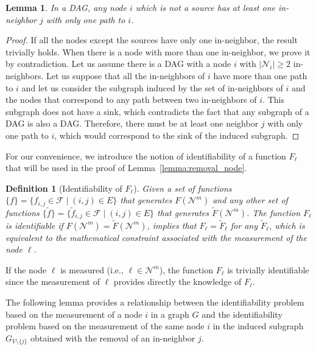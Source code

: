 \documentclass[letterpaper,10pt,journal]{IEEEtran}
\newcommand{\F}{\mathcal{F}}
\newtheorem{definition}{Definition}
\newtheorem{lemma}{Lemma}
\newcommand{\abs}[1]{\left|#1\right|}
\newcommand{\NN}{\mathcal{N}}
\newcommand{\aNN}{\abs{\mathcal{N}_i}}
\begin{document}
\begin{lemma}\label{lemma:unique_path}
    In a DAG, any node $i$ which is not a source has at least one in-neighbor $j$ with only one path to $i$.   
\end{lemma}
\begin{proof}
If all the nodes except the sources have only one in-neighbor, the result trivially holds. When there is a node with more than one in-neighbor, we prove it by contradiction. Let us assume there is a DAG with a node $i$ with $\aNN\ge 2$ in-neighbors.  Let us suppose that all the in-neighbors of $i$ have more than one path to $i$ and let us consider the subgraph induced by the set of in-neighbors of $i$ and the nodes that correspond to any path between two in-neighbors of $i$. This subgraph does not have a sink, which contradicts the fact that any subgraph of a DAG is also a DAG. Therefore, there must be at least one neighbor $j$ with only one path to $i$, which would correspond to the sink of the induced subgraph. 
\end{proof}




 

For our convenience, we introduce the notion of  identifiability of a function $F_\ell$ that will be used in the proof of Lemma~\ref{lemma:removal_node}.


\begin{definition}[Identifiability of $F_\ell$]\label{def:math_identifiability_Fi}
    Given a set of functions $\{ f \}=\{f_{i,j}\in \F\;|\;(i,j)\in E\}$ that generates $F(\NN^m)$ and any other set of functions $\{ \tilde f \}=\{\tilde f_{i,j}\in\F\;|\;(i,j)\in E\}$ that generates $\tilde F(\NN^m)$. The function $F_\ell$ is identifiable if $
    F(\NN^m)=\tilde F(\NN^m)
    $, implies that $F_{\ell}=\tilde F_{\ell}$ for any $\tilde F_{\ell}$, which is equivalent to the mathematical constraint associated with the measurement of the node $\ell$.
\end{definition}

If the node $\ell$ is measured (i.e., $\ell\in\NN^m$), the function $F_\ell$ is trivially identifiable since the measurement of $\ell$ provides directly the knowledge of $F_\ell$.

The following lemma provides a relationship between the identifiability problem based on the measurement of a node $i$ in a graph $G$ and the identifiability problem based on the measurement of the same node $i$ in the induced subgraph $G_{V\setminus\{ j\}}$ obtained with the removal of an in-neighbor $j$.
\end{document}
